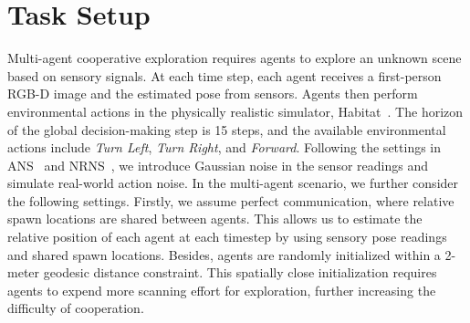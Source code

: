 \section{Task Setup}

Multi-agent cooperative exploration requires agents to explore an unknown scene based on sensory signals.
At each time step, each agent receives a first-person RGB-D image and the estimated pose from
sensors. Agents then perform environmental actions in the physically realistic simulator, Habitat~\cite{habitat}. The horizon of the global decision-making step is 15 steps, and the available environmental actions include \emph{Turn Left}, \emph{Turn Right}, and \emph{Forward}. Following the settings in ANS~\cite{ans} and NRNS~\cite{norl}, we introduce Gaussian noise in the sensor readings and simulate real-world action noise. In the multi-agent scenario, we further consider the following settings. Firstly, we assume perfect communication, where relative spawn locations are shared between agents. This allows us to estimate the relative position of each agent at each timestep by using sensory pose readings and shared spawn locations. Besides, agents are randomly initialized within a 2-meter geodesic distance constraint. This spatially close initialization requires agents to expend more scanning effort for exploration, further increasing the difficulty of cooperation.









